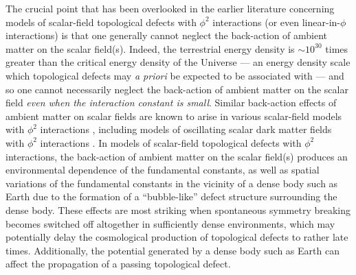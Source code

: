 \documentclass[aps,prd,onecolumn,nofootinbib]{revtex4-2} %
\begin{document}
The crucial point that has been overlooked in the earlier literature concerning models of scalar-field topological defects with $\phi^2$ interactions (or even linear-in-$\phi$ interactions) is that one generally cannot neglect the back-action of ambient matter on the scalar field(s). 
Indeed, the terrestrial energy density is $\sim 10^{30}$ times greater than the critical energy density of the Universe 
--- an energy density scale which topological defects may \textit{a priori} be expected to be associated with --- 
and so one cannot necessarily neglect the back-action of ambient matter on the scalar field \textit{even when the interaction constant is small}. 
Similar back-action effects of ambient matter on scalar fields are known to arise in various scalar-field models with $\phi^2$ interactions \cite{Damour-Farese_1993-phi2,Damour-Farese_1996-phi2,Pietroni_2005-symmetron,Olive-Pospelov_2008-FCs+symmetron,Khoury_2010-symmetron,Updahye_2013-symmetron,Khoury_2011-symmetron,Jaffe_2017-symmetron,Abele_2018-symmetron,Burrage_2018-symmetron,Brax-Fichet_2019-symmetron,Vardanyan_2019-symmetron,Suyama_2015-asymmetron,Pretorius_2016-asymmetron,Popchev_2016-asymmetron,Doneva_2016-asymmetron,Suyama_2017-asymmetron}, including models of oscillating scalar dark matter fields with $\phi^2$ interactions \cite{Stadnik_2015_DM-LIFO,Stadnik_2015_DM-VFCs,Stadnik_2016_DM-clocks,Blas-Sibiryakov_2017_DM-binaries,Hees_2018_DM-EP,Soerensen_2018_DM-BBN}. 
In models of scalar-field topological defects with $\phi^2$ interactions, the back-action of ambient matter on the scalar field(s) produces an environmental dependence of the fundamental constants, as well as spatial variations of the fundamental constants in the vicinity of a dense body such as Earth due to the formation of a ``bubble-like'' defect structure surrounding the dense body. 
These effects are most striking when spontaneous symmetry breaking becomes switched off altogether in sufficiently dense environments, which may potentially delay the cosmological production of topological defects to rather late times. 
Additionally, the potential generated by a dense body such as Earth can affect the propagation of a passing topological defect. 
\end{document}
